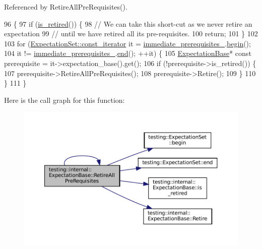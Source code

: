 Referenced by Retire\+All\+Pre\+Requisites().


\begin{DoxyCode}
96                                                   \{
97   \textcolor{keywordflow}{if} (\hyperlink{classtesting_1_1internal_1_1ExpectationBase_afe539dbc5b29d9635403767a4708c476}{is\_retired}()) \{
98     \textcolor{comment}{// We can take this short-cut as we never retire an expectation}
99     \textcolor{comment}{// until we have retired all its pre-requisites.}
100     \textcolor{keywordflow}{return};
101   \}
102 
103   \textcolor{keywordflow}{for} (\hyperlink{classtesting_1_1ExpectationSet_ab269a45f80d8c4f747b29de454a084bb}{ExpectationSet::const\_iterator} it = 
      \hyperlink{classtesting_1_1internal_1_1ExpectationBase_a186eff0fdcacc8c1e1a2becdec11d3cd}{immediate\_prerequisites\_}.\hyperlink{classtesting_1_1ExpectationSet_ad7b8b900ef3f3e35a5d93aecd452504c}{begin}();
104        it != \hyperlink{classtesting_1_1internal_1_1ExpectationBase_a186eff0fdcacc8c1e1a2becdec11d3cd}{immediate\_prerequisites\_}.\hyperlink{classtesting_1_1ExpectationSet_aac2a004529006c827e4d3420c4d4187a}{end}(); ++it) \{
105     \hyperlink{classtesting_1_1internal_1_1ExpectationBase_a8c82a7ecad5831a3ce5ce8cc56ae172d}{ExpectationBase}* \textcolor{keyword}{const} prerequisite = it->expectation\_base().get();
106     \textcolor{keywordflow}{if} (!prerequisite->is\_retired()) \{
107       prerequisite->RetireAllPreRequisites();
108       prerequisite->Retire();
109     \}
110   \}
111 \}
\end{DoxyCode}
Here is the call graph for this function\+:
\nopagebreak
\begin{figure}[H]
\begin{center}
\leavevmode
\includegraphics[width=350pt]{classtesting_1_1internal_1_1ExpectationBase_afb623801e8de31fcd7b352e200649f7d_cgraph}
\end{center}
\end{figure}
